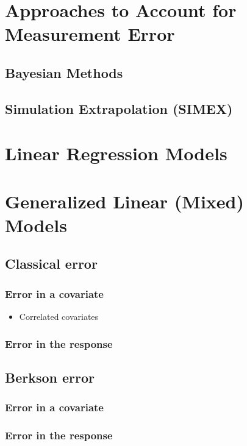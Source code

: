 \documentclass[]{book}
\providecommand{\tightlist}{%
  \setlength{\itemsep}{0pt}\setlength{\parskip}{0pt}}
\theoremstyle{definition}
\theoremstyle{definition}
\theoremstyle{definition}
\theoremstyle{remark}
\begin{document}
\chapter{Approaches to Account for Measurement
Error}\label{approaches-to-account-for-measurement-error}

\section{Bayesian Methods}\label{bayesian-methods}

\section{Simulation Extrapolation
(SIMEX)}\label{simulation-extrapolation-simex}

\chapter{Linear Regression Models}\label{LinReg}

\chapter{Generalized Linear (Mixed) Models}\label{GLMMs}

\section{Classical error}\label{classical-error}

\subsection{Error in a covariate}\label{error-in-a-covariate}

\begin{itemize}
\tightlist
\item
  Correlated covariates
\end{itemize}

\subsection{Error in the response}\label{error-in-the-response-1}

\section{Berkson error}\label{berkson-error}

\subsection{Error in a covariate}\label{error-in-a-covariate-1}

\subsection{Error in the response}\label{error-in-the-response-2}


\end{document}
